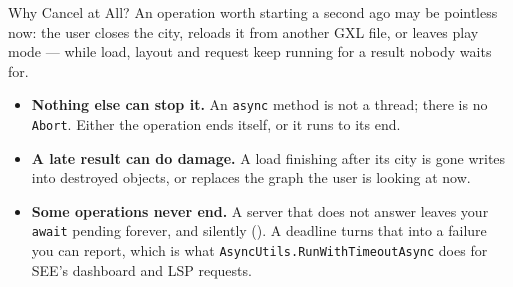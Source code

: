 \begin{frame}{Why Cancel at All?}
  An operation worth starting a second ago may be pointless now: the user
  closes the city, reloads it from another GXL file, or leaves play mode ---
  while load, layout and request keep running for a result nobody waits for.
  \vspace{0.5ex}

  \begin{itemize}
    \item \textbf{Nothing else can stop it.} An \texttt{async} method is not a
      thread; there is no \texttt{Abort}. Either the operation ends itself, or
      it runs to its end.
    \item \textbf{A late result can do damage.} A load finishing after its city
      is gone writes into destroyed objects, or replaces the graph the user is
      looking at now.
    \item \textbf{Some operations never end.} A server that does not answer
      leaves your \texttt{await} pending forever, and silently
      (). A deadline turns that into a failure you
      can report, which is what \texttt{AsyncUtils.RunWithTimeoutAsync} does
      for SEE's dashboard and LSP requests.
  \end{itemize}
  \vspace{0.2ex}

\end{frame}

